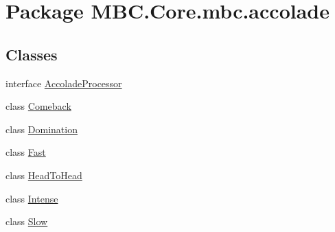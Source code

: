 \hypertarget{namespace_m_b_c_1_1_core_1_1mbc_1_1accolade}{\section{Package M\-B\-C.\-Core.\-mbc.\-accolade}
\label{namespace_m_b_c_1_1_core_1_1mbc_1_1accolade}
}
\subsection*{Classes}
\begin{DoxyCompactItemize}
\item 
interface \hyperlink{interface_m_b_c_1_1_core_1_1mbc_1_1accolade_1_1_accolade_processor}{Accolade\-Processor}
\item 
class \hyperlink{class_m_b_c_1_1_core_1_1mbc_1_1accolade_1_1_comeback}{Comeback}
\item 
class \hyperlink{class_m_b_c_1_1_core_1_1mbc_1_1accolade_1_1_domination}{Domination}
\item 
class \hyperlink{class_m_b_c_1_1_core_1_1mbc_1_1accolade_1_1_fast}{Fast}
\item 
class \hyperlink{class_m_b_c_1_1_core_1_1mbc_1_1accolade_1_1_head_to_head}{Head\-To\-Head}
\item 
class \hyperlink{class_m_b_c_1_1_core_1_1mbc_1_1accolade_1_1_intense}{Intense}
\item 
class \hyperlink{class_m_b_c_1_1_core_1_1mbc_1_1accolade_1_1_slow}{Slow}
\end{DoxyCompactItemize}
